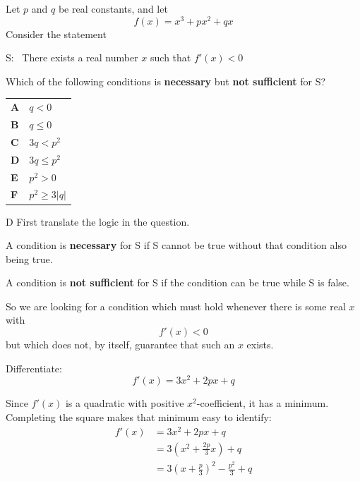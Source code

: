 \documentclass[11pt,a4paper]{article}
\begin{document}
\begin{enumerate}[label=\textbf{\arabic*.},leftmargin=*,itemsep=0pt,start=18]
\questionitem[Logic]
Let $p$ and $q$ be real constants, and let
\[f(x)=x^3+px^2+qx\] Consider the statement 
\begin{center}
\begin{minipage}{0.82\linewidth}
\centering
S: \, There exists a real number $x$ such that $f'(x)<0$
\end{minipage}
\end{center}
Which of the following conditions is \textbf{necessary} but \textbf{not sufficient} for S?

\par\vspace*{12pt}
\begin{tabularx}{\linewidth}{@{}>{\bfseries}l Y@{}}
A &
$q<0$
\\[0.8em]
B &
$q\le 0$
\\[0.8em]
C &
$3q<p^2$
\\[0.8em]
D &
$3q\le p^2$
\\[0.8em]
E &
$p^2>0$
\\[0.8em]
F &
$p^2\ge 3|q|$
\\
\end{tabularx}

\begin{djsSolution}{D}
First translate the logic in the question.

A condition is \textbf{necessary} for S if S cannot be true without that condition also being true.

A condition is \textbf{not sufficient} for S if the condition can be true while S is false.

So we are looking for a condition which must hold whenever there is some real \(x\) with
\[
f'(x)<0
\]
but which does not, by itself, guarantee that such an \(x\) exists.

Differentiate:
\[
f'(x)=3x^2+2px+q
\]

Since \(f'(x)\) is a quadratic with positive \(x^2\)-coefficient, it has a minimum. Completing the square makes that minimum easy to identify:
\[
\begin{aligned}
f'(x)
&=3x^2+2px+q\\
&=3\left(x^2+\frac{2p}{3}x\right)+q\\
&=3\left(x+\frac{p}{3}\right)^2-\frac{p^2}{3}+q
\end{aligned}
\]


\end{djsSolution}
\end{enumerate}
\end{document}
